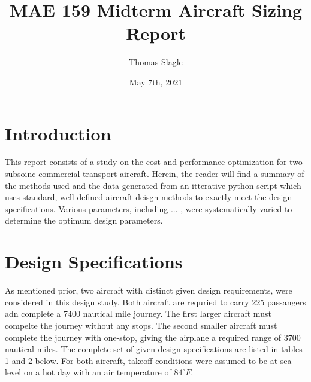 \documentclass{article}
\title{MAE 159 Midterm Aircraft Sizing Report}
\author{Thomas Slagle}
\date{May 7th, 2021}
\begin{document}
    \maketitle

    \section{Introduction}
    \begin{flushleft}
        This report consists of a study on the cost and performance optimization
        for two subsoinc commercial transport aircraft. Herein, the reader will
        find a summary of the methods used and the data generated from an
        itterative python script which uses standard, well-defined aircraft
        deisgn methods to exactly meet the design specifications. Various
        parameters, including ... , were systematically varied to determine the
        optimum design parameters.
    \end{flushleft}

    \section{Design Specifications}
    \begin{flushleft}
        As mentioned prior, two aircraft with distinct given design
        requirements, were considered in this design study. Both aircraft are
        requried to carry 225 passangers adn complete a 7400 nautical mile
        journey. The first larger aircraft must compelte the journey without any
        stops. The second smaller aircraft must complete the journey with
        one-stop, giving the airplane a required range of 3700 nautical miles.
        The complete set of given design specifications are listed in tables 1
        and 2 below. For both aircraft, takeoff conditions were assumed to be at
        sea level on a hot day with an air temperature of $84^{\circ}F$.
    \end{flushleft}
\end{document}
